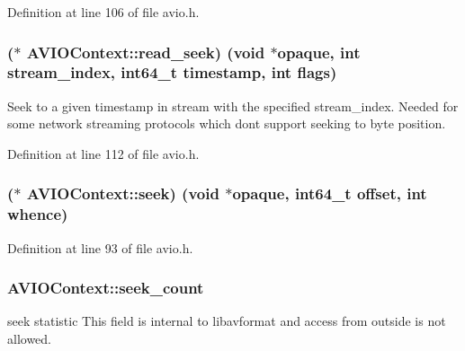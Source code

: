 Definition at line 106 of file avio.\+h.

\subsubsection[{\texorpdfstring{read\+\_\+seek}{read_seek}}]{($\ast$ A\+V\+I\+O\+Context\+::read\+\_\+seek) ({\bf void} $\ast${\bf opaque}, {\bf int} stream\+\_\+index, {\bf int64\+\_\+t} timestamp, {\bf int} flags)}\hypertarget{struct_a_v_i_o_context_ac2e538dd7f6a73cbc77e6ffdf3f11882}{}\label{struct_a_v_i_o_context_ac2e538dd7f6a73cbc77e6ffdf3f11882}
Seek to a given timestamp in stream with the specified stream\+\_\+index. Needed for some network streaming protocols which don\textquotesingle{}t support seeking to byte position. 

Definition at line 112 of file avio.\+h.

\subsubsection[{\texorpdfstring{seek}{seek}}]{($\ast$ A\+V\+I\+O\+Context\+::seek) ({\bf void} $\ast${\bf opaque}, {\bf int64\+\_\+t} {\bf offset}, {\bf int} whence)}\hypertarget{struct_a_v_i_o_context_a4cda0cd632c90d13a546f663287e6cf5}{}\label{struct_a_v_i_o_context_a4cda0cd632c90d13a546f663287e6cf5}


Definition at line 93 of file avio.\+h.

\subsubsection[{\texorpdfstring{seek\+\_\+count}{seek_count}}]{ A\+V\+I\+O\+Context\+::seek\+\_\+count}\hypertarget{struct_a_v_i_o_context_a38b3c122a21fc2271e3174342e87a79f}{}\label{struct_a_v_i_o_context_a38b3c122a21fc2271e3174342e87a79f}
seek statistic This field is internal to libavformat and access from outside is not allowed. 

